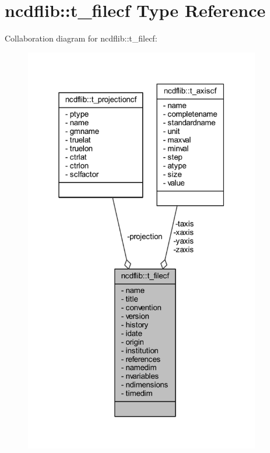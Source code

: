 \hypertarget{structncdflib_1_1t__filecf}{}\section{ncdflib\+:\+:t\+\_\+filecf Type Reference}
\label{structncdflib_1_1t__filecf}


Collaboration diagram for ncdflib\+:\+:t\+\_\+filecf\+:\nopagebreak
\begin{figure}[H]
\begin{center}
\leavevmode
\includegraphics[width=292pt]{structncdflib_1_1t__filecf__coll__graph}
\end{center}
\end{figure}
